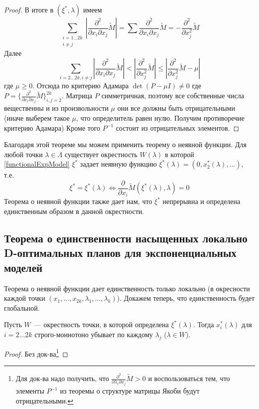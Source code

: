 \begin{proof}
В итоге в $(\xi^{*}, \lambda)$ имеем 
$$\sum\limits_{\substack{i=1…2k \\ i \neq j}}   | \frac{\partial^2}{\partial x_i \partial x_j} \tilde{M}| = \sum \frac{\partial^2}{\partial x_i \partial x_j} \tilde{M} = -\frac{\partial^2}{\partial x_j^2} \tilde{M}$$  
Далее
$$ \sum\limits_{i =2 …2k, i \neq j} | \frac{\partial^2}{\partial x_i \partial x_j} \tilde{M}| < |\frac{\partial ^2 }{\partial x_j^2}\tilde{M}| \leq
|\frac{\partial ^2 }{\partial x_j^2}\tilde{M} - \mu|$$
где $\mu \geq 0$.
Отсюда по критерию Адамара $\det (P - \mu I) \neq 0$
где $P = \{  \frac{\partial^2}{\partial x_i \partial x_j} \tilde{M} \}_{i,j=2}^{2k}$. 
Матрица $P$ симметричная, поэтому все собственные числа вещественны и  из произвольности $\mu$ они все должны быть отрицательными (иначе выберем такое $\mu$, что определитель равен нулю. Получим противоречие критерию Адамара)
Кроме того $P^{-1}$ состоит из отрицательных элементов.
\end{proof}

Благодаря этой теореме мы можем применить теорему о неявной функции. 
Для любой точки $\lambda \in \Lambda$ существует окрестность $W(\lambda)$  в которой \eqref{functionalExpModel} $\xi^{*}$ задает неявную функцию 
$\xi^{*}(\lambda)=(0, x_2^{*}(\lambda),…)$, т.е.  
$$\xi^{*} = \xi^{*}(\lambda) \Leftrightarrow \frac{\partial}{\partial x_i}\tilde{M}(\xi^{*}(\lambda), \lambda)=0$$
Теорема о неявной функции также дает нам, что $\xi^{*}$ непрерывна и определена единственным образом в данной окрестности.


\subsection{Теорема о единственности насыщенных локально D-оптимальных планов для экспоненциальных моделей}
Теорема о неявной функции дает единственность только локально (в окресности каждой точки $(x_1, …, x_{2k}, \lambda_1,…,\lambda_{k})$). Докажем теперь, что единственность будет глобальной.

\begin{lem}
Пусть $W$ — окрестность точки, в которой определена $\xi^{*}(\lambda)$. Тогда $x_{i}^{*}(\lambda)$ для $i=2…2k$ строго-моннотоно убывает по каждому $\lambda_{j}$ ($\lambda \in W$).
\end{lem}
\begin{proof}
Без док-ва\footnote{Для док-ва надо получить, что $\frac{\partial^2}{\partial \lambda_i \partial x_j}\tilde{M} > 0$ и воспользоваться тем, что элементы $P^{-1}$ из теоремы о структуре матрицы Якоби будут отрицательными.}
\end{proof}


